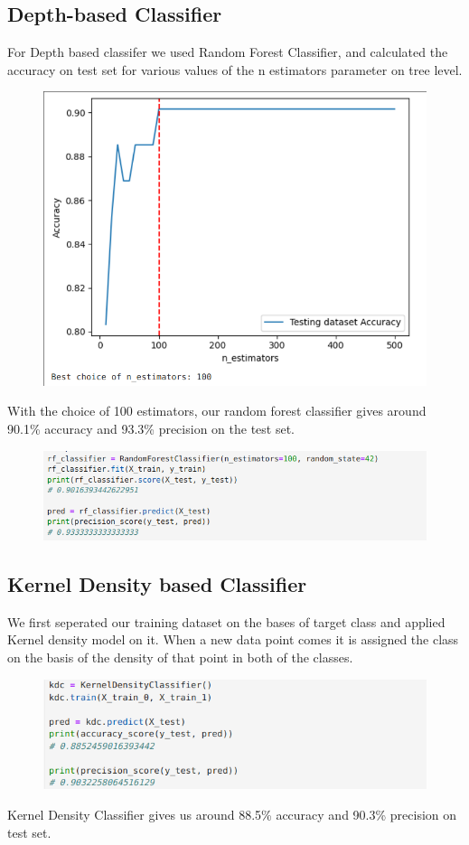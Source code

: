 \documentclass{article}
\begin{document}
\subsection{Depth-based Classifier}
For Depth based classifer we used Random Forest Classifier, and calculated the accuracy on test set for various values of the n estimators parameter on tree level.

\begin{figure}[h]
\centering
    \includegraphics[width=0.75\linewidth]{randomforest.png}
\end{figure}

\noindent With the choice of 100 estimators, our random forest classifier gives around 90.1\% accuracy  and 93.3\% precision on the test set.
\begin{figure}[h]
\centering
    \includegraphics[width=0.75\linewidth]{rf.png}
\end{figure}

\subsection{Kernel Density based Classifier}
We first seperated our training dataset on the bases of target class and applied Kernel density model on it. When a new data point comes it is assigned the class on the basis of the density of that point in both of the classes.

\begin{figure}[h]
\centering
    \includegraphics[width=0.75\linewidth]{kdc.png}
\end{figure}
\noindent Kernel Density Classifier gives us around 88.5\% accuracy 
 and 90.3\% precision on test set.
\end{document}
